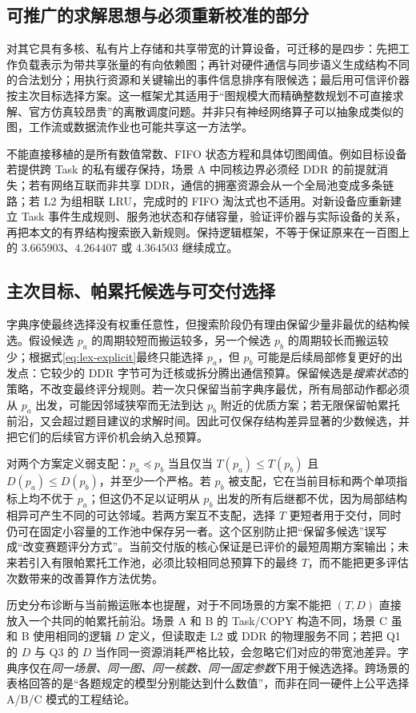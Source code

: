 \subsection{可推广的求解思想与必须重新校准的部分}
对其它具有多核、私有片上存储和共享带宽的计算设备，可迁移的是四步：先把工作负载表示为带共享张量的有向依赖图；再针对硬件通信与同步语义生成结构不同的合法划分；用执行资源和关键输出的事件信息排序有限候选；最后用可信评价器按主次目标选择方案。这一框架尤其适用于“图规模大而精确整数规划不可直接求解、官方仿真较昂贵”的离散调度问题。并非只有神经网络算子可以抽象成类似的图，工作流或数据流作业也可能共享这一方法学。

不能直接移植的是所有数值常数、FIFO 状态方程和具体切图阈值。例如目标设备若提供跨 Task 的私有缓存保持，场景 A 中同核边界必须经 DDR 的前提就消失；若有网络互联而非共享 DDR，通信的拥塞资源会从一个全局池变成多条链路；若 L2 为组相联 LRU，完成时的 FIFO 淘汰式也不适用。对新设备应重新建立 Task 事件生成规则、服务池状态和存储容量，验证评价器与实际设备的关系，再把本文的有界结构搜索嵌入新规则。保持逻辑框架，不等于保证原来在一百图上的 $3.665903$、$4.264407$ 或 $4.364503$ 继续成立。

\subsection{主次目标、帕累托候选与可交付选择}
字典序使最终选择没有权重任意性，但搜索阶段仍有理由保留少量非最优的结构候选。假设候选 $p_a$ 的周期较短而搬运较多，另一个候选 $p_b$ 的周期较长而搬运较少；根据式\eqref{eq:lex-explicit}最终只能选择 $p_a$，但 $p_b$ 可能是后续局部修复更好的出发点：它较少的 DDR 字节可为迁核或拆分腾出通信预算。保留候选是\emph{搜索状态}的策略，不改变最终评分规则。若一次只保留当前字典序最优，所有局部动作都必须从 $p_a$ 出发，可能因邻域狭窄而无法到达 $p_b$ 附近的优质方案；若无限保留帕累托前沿，又会超过题目建议的求解时间。因此可仅保存结构差异显著的少数候选，并把它们的后续官方评价机会纳入总预算。

对两个方案定义弱支配：$p_a\preceq p_b$ 当且仅当 $T(p_a)\le T(p_b)$ 且 $D(p_a)\le D(p_b)$，并至少一个严格。若 $p_b$ 被支配，它在当前目标和两个单项指标上均不优于 $p_a$；但这仍不足以证明从 $p_b$ 出发的所有后继都不优，因为局部结构相异可产生不同的可达邻域。若两方案互不支配，选择 $T$ 更短者用于交付，同时仍可在固定小容量的工作池中保存另一者。这个区别防止把“保留多候选”误写成“改变赛题评分方式”。当前交付版的核心保证是已评价的最短周期方案输出；未来若引入有限帕累托工作池，必须比较相同总预算下的最终 $T$，而不能把更多评估次数带来的改善算作方法优势。

历史分布诊断与当前搬运账本也提醒，对于不同场景的方案不能把 $(T,D)$ 直接放入一个共同的帕累托前沿。场景 A 和 B 的 Task/COPY 构造不同，场景 C 虽和 B 使用相同的逻辑 $D$ 定义，但读取走 L2 或 DDR 的物理服务不同；若把 Q1 的 $D$ 与 Q3 的 $D$ 当作同一资源消耗严格比较，会忽略它们对应的带宽池差异。字典序仅在\emph{同一场景、同一图、同一核数、同一固定参数}下用于候选选择。跨场景的表格回答的是“各题规定的模型分别能达到什么数值”，而非在同一硬件上公平选择 A/B/C 模式的工程结论。

